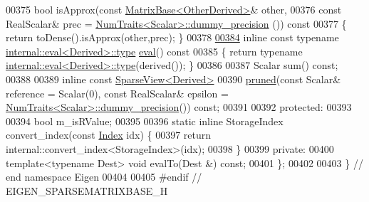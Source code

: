 \begin{DoxyCode}
00375     \textcolor{keywordtype}{bool} isApprox(\textcolor{keyword}{const} \hyperlink{group___core___module_class_eigen_1_1_matrix_base}{MatrixBase<OtherDerived>}& other,
00376                   \textcolor{keyword}{const} RealScalar& prec = \hyperlink{group___core___module_struct_eigen_1_1_num_traits}{NumTraits<Scalar>::dummy\_precision}
      ())\textcolor{keyword}{ const}
00377 \textcolor{keyword}{    }\{ \textcolor{keywordflow}{return} toDense().isApprox(other,prec); \}
00378 
\hyperlink{group___sparse_core___module_a761bd872a06b59632fcff7b7807a77ce}{00384}     \textcolor{keyword}{inline} \textcolor{keyword}{const} \textcolor{keyword}{typename} \hyperlink{struct_eigen_1_1internal_1_1eval}{internal::eval<Derived>::type} 
      \hyperlink{group___sparse_core___module_a761bd872a06b59632fcff7b7807a77ce}{eval}()\textcolor{keyword}{ const}
00385 \textcolor{keyword}{    }\{ \textcolor{keywordflow}{return} \textcolor{keyword}{typename} \hyperlink{struct_eigen_1_1internal_1_1eval}{internal::eval<Derived>::type}(derived()); \}
00386 
00387     Scalar sum() \textcolor{keyword}{const};
00388     
00389     \textcolor{keyword}{inline} \textcolor{keyword}{const} \hyperlink{group___sparse_core___module_class_eigen_1_1_sparse_view}{SparseView<Derived>}
00390     \hyperlink{group___sparse_core___module_ac8d0414b56d9d620ce9a698c1b281e5d}{pruned}(\textcolor{keyword}{const} Scalar& reference = Scalar(0), \textcolor{keyword}{const} RealScalar& epsilon = 
      \hyperlink{group___core___module_struct_eigen_1_1_num_traits}{NumTraits<Scalar>::dummy\_precision}()) \textcolor{keyword}{const};
00391 
00392   \textcolor{keyword}{protected}:
00393 
00394     \textcolor{keywordtype}{bool} m\_isRValue;
00395 
00396     \textcolor{keyword}{static} \textcolor{keyword}{inline} StorageIndex convert\_index(\textcolor{keyword}{const} \hyperlink{group___core___module_a554f30542cc2316add4b1ea0a492ff02}{Index} idx) \{
00397       \textcolor{keywordflow}{return} internal::convert\_index<StorageIndex>(idx);
00398     \}
00399   \textcolor{keyword}{private}:
00400     \textcolor{keyword}{template}<\textcolor{keyword}{typename} Dest> \textcolor{keywordtype}{void} evalTo(Dest &) \textcolor{keyword}{const};
00401 \};
00402 
00403 \} \textcolor{comment}{// end namespace Eigen}
00404 
00405 \textcolor{preprocessor}{#endif // EIGEN\_SPARSEMATRIXBASE\_H}
\end{DoxyCode}
